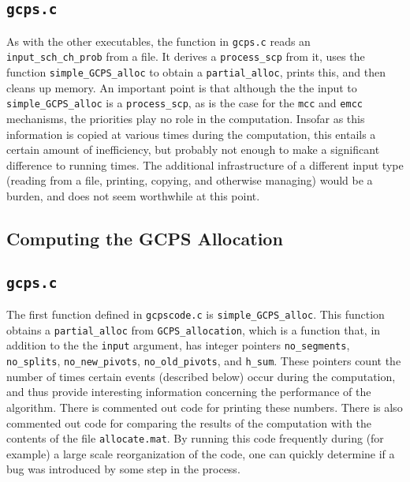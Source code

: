 \documentclass[12pt]{article}
\theoremstyle{definition}
\begin{document}
\begin{appendix}
\subsection{\texttt{gcps.c}} \label{sec:GcpsTop}

As with the other executables, the  function in
\texttt{gcps.c} reads an \texttt{input\_sch\_ch\_prob} from a file.
It derives a \texttt{process\_scp} from it, uses the function
\texttt{simple\_GCPS\_alloc} to obtain a \texttt{partial\_alloc},
prints this, and then cleans up memory.  An important point is that
although the the input to \texttt{simple\_GCPS\_alloc} is a
\texttt{process\_scp}, as is the case for the \texttt{mcc} and
\texttt{emcc} mechanisms, the priorities play no role in the
computation.  Insofar as this information is copied at various times
during the computation, this entails a certain amount of inefficiency,
but probably not enough to make a significant difference to running
times.  The additional infrastructure of a different input type
(reading from a file, printing, copying, and otherwise managing) would
be a burden, and does not seem worthwhile at this point.

\subsection{Computing the GCPS Allocation}

\subsection{\texttt{gcps.c}}

The first function defined in \texttt{gcpscode.c} is
\texttt{simple\_GCPS\_alloc}.  This function obtains a
\texttt{partial\_alloc} from \texttt{GCPS\_allocation}, which is a
function that, in addition to the the \texttt{input} argument, has
integer pointers \texttt{no\_segments}, \texttt{no\_splits},
\texttt{no\_new\_pivots}, \texttt{no\_old\_pivots}, and
\texttt{h\_sum}.  These pointers count the number of times certain
events (described below) occur during the computation, and thus
provide interesting information concerning the performance of the
algorithm.  There is commented out code for printing these numbers.
There is also commented out code for comparing the results of the
computation with the contents of the file \texttt{allocate.mat}.  By
running this code frequently during (for example) a large scale
reorganization of the code, one can quickly determine if a bug was
introduced by some step in the process.


\end{appendix}
\end{document}
